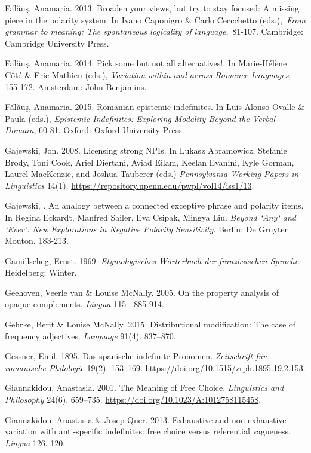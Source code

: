 \documentclass[output=paper]{langscibook}
\begin{document}
Fălăuş, Anamaria. 2013. Broaden your views, but try to stay focused: A missing piece in the polarity system. In Ivano Caponigro \& Carlo Ceccchetto (eds.),~\textit{From grammar to meaning: The spontaneous logicality of language},~81-107. Cambridge: Cambridge University Press. 

Fălăuş, Anamaria. 2014. Pick some but not all alternatives!, In Marie-Hélène Côté \& Eric Mathieu (eds.), \textit{Variation within and across Romance Languages}, 155-172. Amsterdam: John Benjamins.

Fălăuş, Anamaria. 2015. Romanian epistemic indefinites. In Luis Alonso-Ovalle \& Paula \citealt{Menéndez-Benito2015} (eds.), \textit{Epistemic Indefinites: Exploring Modality Beyond the Verbal Domain}, 60-81. Oxford: Oxford University Press.

Gajewski, Jon. 2008. Licensing strong NPIs. In Lukasz Abramowicz, Stefanie Brody, Toni Cook, Ariel Diertani, Aviad Eilam, Keelan Evanini, Kyle Gorman, Laurel MacKenzie, and Joshua Tauberer (eds.) \textit{Pennsylvania Working Papers in Linguistics} 14(1). \url{https://repository.upenn.edu/pwpl/vol14/iss1/13}.

Gajewski, \citealt{Jon2013}. An analogy between a connected exceptive phrase and polarity items. In Regina Eckardt, Manfred Sailer, Eva Csipak, Mingya Liu. \textit{Beyond ‘Any‘ and ‘Ever’: New Explorations in Negative Polarity Sensitivity}. Berlin: De Gruyter Mouton. 183-213.

Gamillscheg, Ernst. 1969. \textit{Etymologisches Wörterbuch der französischen Sprache}. Heidelberg: Winter.

Geehoven, Veerle van \& Louise McNally. 2005. On the property analysis of opaque complements. \textit{Lingua} 115 . 885-914. 

Gehrke, Berit \& Louise McNally. 2015. Distributional modification: The case of frequency adjectives. \textit{Language} 91(4). 837–870.

Gessner, Emil. 1895. Das spanische indefinite Pronomen. \textit{Zeitschrift für romanische Philologie} 19(2). 153–169. \url{https://doi.org/10.1515/zrph.1895.19.2.153}.

Giannakidou, Anastasia. 2001. The Meaning of Free Choice. \textit{Linguistics and Philosophy} 24(6). 659–735. \url{https://doi.org/10.1023/A:1012758115458}.

Giannakidou, Anastasia \& Josep Quer. 2013. Exhaustive and non-exhaustive variation with anti-specific indefinites: free choice versus referential vagueness. \textit{Lingua} 126. 120.
\end{document}
